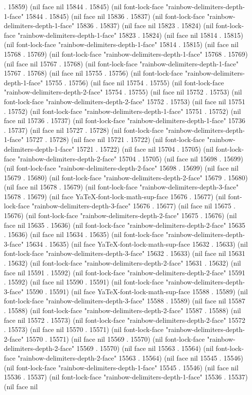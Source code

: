 . 15859) (nil face nil 15844 . 15845) (nil font-lock-face "rainbow-delimiters-depth-1-face" 15844 . 15845) (nil face nil 15836 . 15837) (nil font-lock-face "rainbow-delimiters-depth-1-face" 15836 . 15837) (nil face nil 15823 . 15824) (nil font-lock-face "rainbow-delimiters-depth-1-face" 15823 . 15824) (nil face nil 15814 . 15815) (nil font-lock-face "rainbow-delimiters-depth-1-face" 15814 . 15815) (nil face nil 15768 . 15769) (nil font-lock-face "rainbow-delimiters-depth-1-face" 15768 . 15769) (nil face nil 15767 . 15768) (nil font-lock-face "rainbow-delimiters-depth-1-face" 15767 . 15768) (nil face nil 15755 . 15756) (nil font-lock-face "rainbow-delimiters-depth-1-face" 15755 . 15756) (nil face nil 15754 . 15755) (nil font-lock-face "rainbow-delimiters-depth-2-face" 15754 . 15755) (nil face nil 15752 . 15753) (nil font-lock-face "rainbow-delimiters-depth-2-face" 15752 . 15753) (nil face nil 15751 . 15752) (nil font-lock-face "rainbow-delimiters-depth-1-face" 15751 . 15752) (nil face nil 15736 . 15737) (nil font-lock-face "rainbow-delimiters-depth-1-face" 15736 . 15737) (nil face nil 15727 . 15728) (nil font-lock-face "rainbow-delimiters-depth-1-face" 15727 . 15728) (nil face nil 15721 . 15722) (nil font-lock-face "rainbow-delimiters-depth-1-face" 15721 . 15722) (nil face nil 15704 . 15705) (nil font-lock-face "rainbow-delimiters-depth-2-face" 15704 . 15705) (nil face nil 15698 . 15699) (nil font-lock-face "rainbow-delimiters-depth-2-face" 15698 . 15699) (nil face nil 15679 . 15680) (nil font-lock-face "rainbow-delimiters-depth-2-face" 15679 . 15680) (nil face nil 15678 . 15679) (nil font-lock-face "rainbow-delimiters-depth-3-face" 15678 . 15679) (nil face YaTeX-font-lock-math-sup-face 15676 . 15677) (nil font-lock-face "rainbow-delimiters-depth-3-face" 15676 . 15677) (nil face nil 15675 . 15676) (nil font-lock-face "rainbow-delimiters-depth-2-face" 15675 . 15676) (nil face nil 15635 . 15636) (nil font-lock-face "rainbow-delimiters-depth-2-face" 15635 . 15636) (nil face nil 15634 . 15635) (nil font-lock-face "rainbow-delimiters-depth-3-face" 15634 . 15635) (nil face YaTeX-font-lock-math-sup-face 15632 . 15633) (nil font-lock-face "rainbow-delimiters-depth-3-face" 15632 . 15633) (nil face nil 15631 . 15632) (nil font-lock-face "rainbow-delimiters-depth-2-face" 15631 . 15632) (nil face nil 15591 . 15592) (nil font-lock-face "rainbow-delimiters-depth-2-face" 15591 . 15592) (nil face nil 15590 . 15591) (nil font-lock-face "rainbow-delimiters-depth-3-face" 15590 . 15591) (nil face YaTeX-font-lock-math-sup-face 15588 . 15589) (nil font-lock-face "rainbow-delimiters-depth-3-face" 15588 . 15589) (nil face nil 15587 . 15588) (nil font-lock-face "rainbow-delimiters-depth-2-face" 15587 . 15588) (nil face nil 15572 . 15573) (nil font-lock-face "rainbow-delimiters-depth-2-face" 15572 . 15573) (nil face nil 15570 . 15571) (nil font-lock-face "rainbow-delimiters-depth-2-face" 15570 . 15571) (nil face nil 15569 . 15570) (nil font-lock-face "rainbow-delimiters-depth-2-face" 15569 . 15570) (nil face nil 15563 . 15564) (nil font-lock-face "rainbow-delimiters-depth-2-face" 15563 . 15564) (nil face nil 15545 . 15546) (nil font-lock-face "rainbow-delimiters-depth-1-face" 15545 . 15546) (nil face nil 15536 . 15537) (nil font-lock-face "rainbow-delimiters-depth-1-face" 15536 . 15537) (nil face nil 